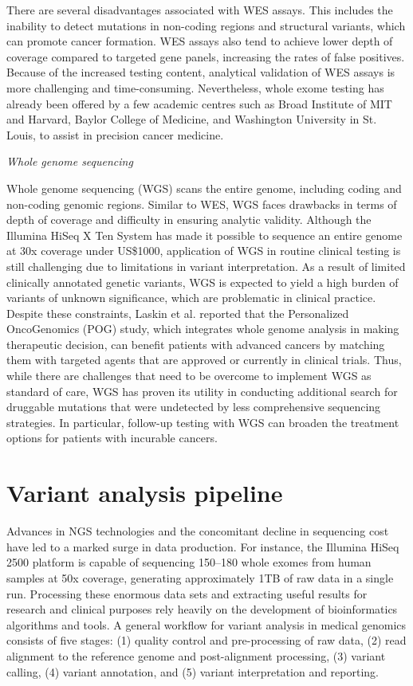 There are several disadvantages associated with WES assays. This includes the inability to detect mutations in non-coding regions and structural variants, which can promote cancer formation. WES assays also tend to achieve lower depth of coverage compared to targeted gene panels, increasing the rates of false positives. Because of the increased testing content, analytical validation of WES assays is more challenging and time-consuming. Nevertheless, whole exome testing has already been offered by a few academic centres such as Broad Institute of MIT and Harvard, Baylor College of Medicine, and Washington University in St. Louis, to assist in precision cancer medicine.

\vspace{5mm}
\noindent\textit{Whole genome sequencing}

Whole genome sequencing (WGS) scans the entire genome, including coding and non-coding genomic regions. Similar to WES, WGS faces drawbacks in terms of depth of coverage and difficulty in ensuring analytic validity. Although the Illumina HiSeq X Ten System has made it possible to sequence an entire genome at 30x coverage under US\$1000, application of WGS in routine clinical testing is still challenging due to limitations in variant interpretation. As a result of limited clinically annotated genetic variants, WGS is expected to yield a high burden of variants of unknown significance, which are problematic in clinical practice. Despite these constraints, Laskin et al. \cite{Laskin2015} reported that the Personalized OncoGenomics (POG) study, which integrates whole genome analysis in making therapeutic decision, can benefit patients with advanced cancers by matching them with targeted agents that are approved or currently in clinical trials. Thus, while there are challenges that need to be overcome to implement WGS as standard of care, WGS has proven its utility in conducting additional search for druggable mutations that were undetected by less comprehensive sequencing strategies. In particular, follow-up testing with WGS can broaden the treatment options for patients with incurable cancers.

\section{Variant analysis pipeline}
\label{sec:Variantanalysispipeline}

Advances in NGS technologies and the concomitant decline in sequencing cost have led to a marked surge in data production. For instance, the Illumina HiSeq 2500 platform is capable of sequencing 150--180 whole exomes from human samples at 50x coverage, generating approximately 1TB of raw data in a single run. Processing these enormous data sets and extracting useful results for research and clinical purposes rely heavily on the development of bioinformatics algorithms and tools. A general workflow for variant analysis in medical genomics consists of five stages: (1) quality control and pre-processing of raw data, (2) read alignment to the reference genome and post-alignment processing, (3) variant calling, (4) variant annotation, and (5) variant interpretation and reporting.

